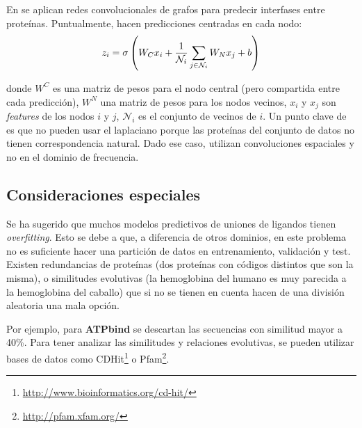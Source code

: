 \documentclass[
    left=2.0cm,         %
    right=2.0cm,        %
    top=2.0cm,          %
    bottom=2.5cm,         %
    bindingoffset=6mm,  %
    nohyphenation=false %
]{eiti/eiti-thesis}
\begin{document}
En \cite{fout2017proteininterface} se aplican redes convolucionales de grafos para
predecir interfases entre proteínas. Puntualmente, hacen predicciones centradas en
cada nodo:
\begin{equation*}
    \LARGE
    z_i = \sigma\left ( W_C x_i + \frac{1}{\mathcal{N}_i} \sum_{j\in \mathcal{N}_i} W_N x_j + b \right )
\end{equation*}

donde $W^C$ es una matriz de pesos para el nodo central (pero compartida entre cada
predicción), $W^N$  una matriz de pesos para los nodos vecinos, 
$x_i$ y $x_j$ son \textit{features} de los nodos $i$ y $j$, $\mathcal{N}_i$ es el conjunto
de vecinos de $i$. Un punto clave de \cite{fout2017proteininterface} es que no pueden
usar el laplaciano porque las proteínas del conjunto de datos no tienen correspondencia
natural. Dado ese caso, utilizan convoluciones espaciales y no en el dominio de frecuencia.









\subsection{Consideraciones especiales} \label{consideraciones}

Se ha sugerido\cite{wallach2018overfitting} que muchos modelos predictivos de
uniones de ligandos tienen \textit{overfitting}. Esto se debe a que, a diferencia
de otros dominios, en este problema no es suficiente hacer una
partición de datos en entrenamiento, validación y test. Existen redundancias
de proteínas (dos proteínas con códigos distintos que son la misma), o similitudes
evolutivas (la hemoglobina del humano es muy parecida a la hemoglobina del caballo) que
si no se tienen en cuenta hacen de una división aleatoria una mala opción.

Por ejemplo, para \textbf{ATPbind} \cite{atpbind} se descartan las secuencias con
similitud mayor a 40\%. Para tener analizar las similitudes y relaciones evolutivas,
se pueden utilizar bases de datos como CDHit\footnote{\url{http://www.bioinformatics.org/cd-hit/}} o
Pfam\footnote{\url{http://pfam.xfam.org/}}.
\end{document}
